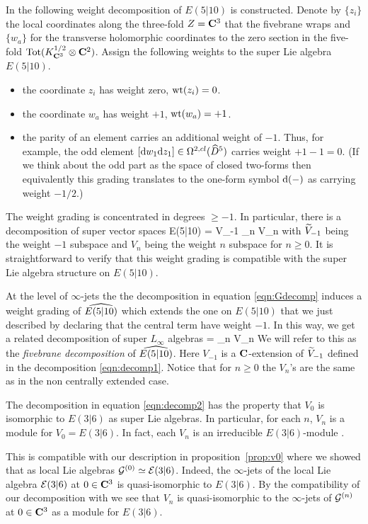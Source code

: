In \cite{KR2} the following weight decomposition of $E(5|10)$ is constructed.
Denote by $\{z_i\}$ the local coordinates along the three-fold $Z=\C^3$ that the fivebrane wraps and $\{w_a\}$ for the transverse holomorphic coordinates to the zero section in the five-fold ${\rm Tot}(K_{\C^3}^{1/2} \otimes \C^2)$.
Assign the following weights to the super Lie algebra $E(5|10)$. 
\begin{itemize} 
\item the coordinate $z_i$ has weight zero, $\wt(z_i) = 0$. 
\item the coordinate $w_a$ has weight $+1$, $\wt(w_a) = +1$. 
\item the parity of an element carries an additional weight of $-1$. 
Thus, for example, the odd element $[\d w_1 \d z_1] \in \Omega^{2,cl}(\Hat{D}^5)$ carries weight $+1 - 1 = 0$. 
(If we think about the odd part as the space of closed two-forms then equivalently this grading translates to the one-form symbol $\d(-)$ as carrying weight $-1/2$.)
\end{itemize} 
The weight grading is concentrated in degrees $\geq -1$. 
In particular, there is a decomposition of super vector spaces
\beqn\label{eqn:decomp1}
E(5|10) = \til V_{-1} \times \bigoplus_{n } V_n 
\eeqn
with $\til V_{-1}$ being the weight $-1$ subspace and $V_n$ being the weight $n$ subspace for $n \geq 0$.  
It is straightforward to verify that this weight grading is compatible with the super Lie algebra structure on $E(5|10)$.


At the level of $\infty$-jets the the decomposition in equation \eqref{eqn:Gdecomp} induces a weight grading of $\Hat{E(5|10)}$ which extends the one on $E(5|10)$ that we just described by declaring that the central term have weight $-1$.
In this way, we get a related decomposition of super $L_\infty$ algebras
\beqn\label{eqn:decomp2}
 = \bigoplus_{n } V_n
\eeqn
We will refer to this as the \textit{fivebrane decomposition} of $\Hat{E(5|10)}$.
Here $V_{-1}$ is a $\C$-extension of $\til V_{-1}$ defined in the decomposition \eqref{eqn:decomp1}.
Notice that for $n \geq 0$ the $V_n$'s are the same as in the non centrally extended case.

The decomposition in equation \eqref{eqn:decomp2} has the property that $V_0$ is isomorphic to $E(3|6)$ as super Lie algebras.
In particular, for each $n$, $V_n$ is a module for $V_0 = E(3|6)$.
In fact, each $V_n$ is an irreducible $E(3|6)$-module \cite{KR2}.

This is compatible with our description in proposition~\ref{prop:v0} where we showed that as local Lie algebras $\cG^{(0)} \simeq \cE(3|6)$. 
Indeed, the $\infty$-jets of the local Lie algebra $\cE(3|6)$ at $0 \in \C^3$ is quasi-isomorphic to $E(3|6)$. 
By the compatibility of our decomposition with \cite{KR2} we see that $V_n$ is quasi-isomorphic to the $\infty$-jets of $\cG^{(n)}$ at $0 \in \C^3$ as a module for $E(3|6)$.


